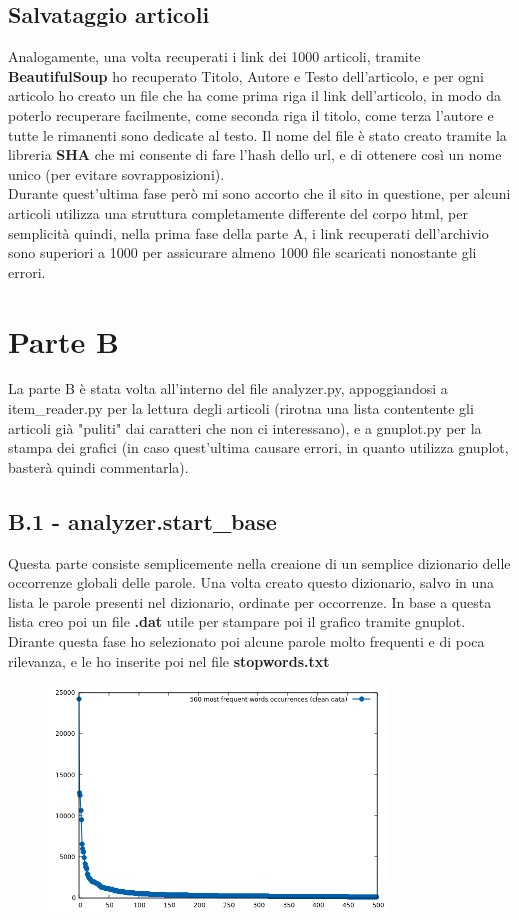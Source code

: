 \documentclass{article}
\begin{document}
\subsection{Salvataggio articoli}Analogamente, una volta recuperati i link dei 1000 articoli, tramite \textbf{BeautifulSoup} ho recuperato Titolo, Autore e Testo dell'articolo, e per ogni articolo ho creato un file che ha come prima riga il link dell'articolo, in modo da poterlo recuperare facilmente, come seconda riga il titolo, come terza l'autore e tutte le rimanenti sono dedicate al testo. Il nome del file è stato creato tramite la libreria \textbf{SHA} che mi consente di fare l'hash dello url, e di ottenere così un nome unico (per evitare sovrapposizioni).\\Durante quest'ultima fase però mi sono accorto che il sito in questione, per alcuni articoli utilizza una struttura completamente differente del corpo html, per semplicità quindi, nella prima fase della parte A, i link recuperati dell'archivio sono superiori a 1000 per assicurare almeno 1000 file scaricati nonostante gli errori.
\section{Parte B}
La parte B è stata volta all'interno del file analyzer.py, appoggiandosi a item\_reader.py per la lettura degli articoli (rirotna una lista contentente gli articoli già "puliti" dai caratteri che non ci interessano), e a gnuplot.py per la stampa dei grafici (in caso quest'ultima causare errori, in quanto utilizza gnuplot, basterà quindi commentarla).
\subsection{B.1 - analyzer.start\_base}
Questa parte consiste semplicemente nella creaione di un semplice dizionario delle occorrenze globali delle parole.
Una volta creato questo dizionario, salvo in una lista le parole presenti nel dizionario, ordinate per occorrenze.
In base a questa lista creo poi un file \textbf{.dat} utile per stampare poi il grafico tramite gnuplot.
Dirante questa fase ho selezionato poi alcune parole molto frequenti e di poca rilevanza, e le ho inserite poi nel file \textbf{stopwords.txt}
\begin{figure}[h]
	\includegraphics[width=9cm]{plotted_dirty.png}
	\centering
\end{figure}
\end{document}

